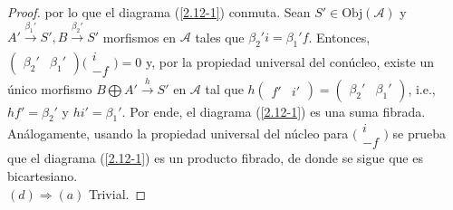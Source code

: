 \documentclass[tesis]{subfiles}
\begin{document}
\begin{proof}
    por lo que el diagrama (\ref{2.12-1}) conmuta. Sean $S'\in\text{Obj}(\mathscr{A})$ y $A'\xrightarrow[]{\beta_1'}S', B\xrightarrow[]{\beta_2'}S'$ morfismos en $\mathscr{A}$ tales que $\beta_2'i = \beta_1' f$. Entonces, $(\begin{smallmatrix} \beta_2' &\beta_1' \end{smallmatrix})\big(\begin{smallmatrix} i \\ -f \end{smallmatrix}\big)=0$ y, por la propiedad universal del conúcleo, existe un único morfismo $B\bigoplus A' \xrightarrow[]{h} S'$ en $\mathscr{A}$ tal que $h(\begin{smallmatrix} f' &i' \end{smallmatrix}) = (\begin{smallmatrix} \beta_2' &\beta_1' \end{smallmatrix})$, i.e., $hf'=\beta_2'$ y $hi'=\beta_1'$. Por ende, el diagrama (\ref{2.12-1}) es una suma fibrada. Análogamente, usando la propiedad universal del núcleo para $\big(\begin{smallmatrix} i \\ -f \end{smallmatrix}\big)$ se prueba que el diagrama (\ref{2.12-1}) es un producto fibrado, de donde se sigue que es bicartesiano. \\

    $(d)\Rightarrow(a)$ Trivial.    
\end{proof}
\end{document}
